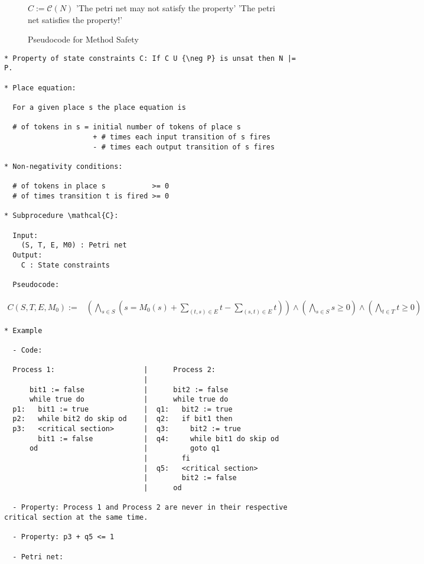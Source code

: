 \documentclass{llncs}
\begin{document}
\begin{figure}
\begin{algorithmic}[1]
\State $C := \mathcal C(N)$
  \State \Return 'The petri net may not satisfy the property'
\Else
  \State \Return 'The petri net satisfies the property!'
\EndIf
\end{algorithmic}
\caption{Pseudocode for Method Safety}
\label{fig:method-safety-pseudocode}
\end{figure}

\begin{verbatim}
* Property of state constraints C: If C U {\neg P} is unsat then N |= P.

* Place equation:
  
  For a given place s the place equation is

  # of tokens in s = initial number of tokens of place s
                     + # times each input transition of s fires
                     - # times each output transition of s fires

* Non-negativity conditions:

  # of tokens in place s           >= 0
  # of times transition t is fired >= 0

* Subprocedure \mathcal{C}:

  Input:
    (S, T, E, M0) : Petri net
  Output:
    C : State constraints

  Pseudocode:

\end{verbatim}

\begin{align*}
  C(S, T, E, M_0) :=& \left( \bigwedge_{s \in S} \left(
    s = M_0(s) + \sum_{(t, s) \in E} t - \sum_{(s, t) \in E} t
  \right) \right) \land
    \left( \bigwedge_{s \in S} s \ge 0 \right) \land
    \left( \bigwedge_{t \in T} t \ge 0 \right)
\end{align*}

\newpage

\begin{verbatim}
* Example

  - Code:

  Process 1:                     |      Process 2:
                                 |
      bit1 := false              |      bit2 := false
      while true do              |      while true do
  p1:   bit1 := true             |  q1:   bit2 := true
  p2:   while bit2 do skip od    |  q2:   if bit1 then
  p3:   <critical section>       |  q3:     bit2 := true
        bit1 := false            |  q4:     while bit1 do skip od
      od                         |          goto q1
                                 |        fi
                                 |  q5:   <critical section>
                                 |        bit2 := false
                                 |      od

  - Property: Process 1 and Process 2 are never in their respective critical section at the same time.

  - Property: p3 + q5 <= 1

  - Petri net:

\end{verbatim}
\end{document}
